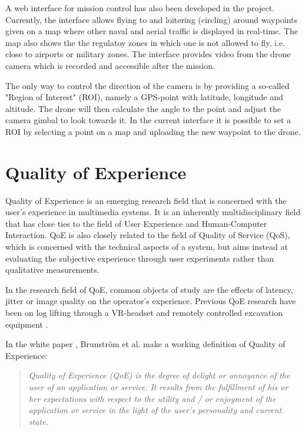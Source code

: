 \documentclass[nofilelist]{cslthse-msc}
\begin{document}
A web interface for mission control has also been developed in the project. Currently, the interface allows flying to and loitering (circling) around waypoints given on a map where other naval and aerial traffic is displayed in real-time. The map also shows the the regulatoy zones in which one is not allowed to fly, i.e. close to airports or military zones. The interface provides video from the drone camera which is recorded and accessible after the mission.

The only way to control the direction of the camera is by providing a so-called "Region of Interest" (ROI), namely a GPS-point with latitude, longitude and altitude. The drone will then calculate the angle to the point and adjust the camera gimbal to look towards it. In the current interface it is possible to set a ROI by selecting a point on a map and uploading the new waypoint to the drone.

\section{Quality of Experience}
Quality of Experience is an emerging research field that is concerned with the user's experience in multimedia systems. It is an inherently multidisciplinary field that has close ties to the field of User Experience and Human-Computer Interaction. QoE is also closely related to the field of Quality of Service (QoS), which is concerned with the technical aspects of a system, but aims instead at evaluating the subjective experience through user experiments rather than qualitative measurements.

In the research field of QoE, common objects of study are the effects of latency, jitter or image quality on the operator's experience. Previous QoE research have been on log lifting through a VR-headset \cite{industry4.0} and remotely controlled excavation equipment \cite{latency-impact}.

In the white paper \cite{qoe-definition}, Brunström et al. make a working definition of Quality of Experience: 

\begin{quote}
   \textit{Quality of Experience (QoE) is the degree of delight or annoyance of the user of an application or service. It results from the fulfillment of his or her expectations with respect to the utility and / or enjoyment of the application or service in the light of the user’s personality and current state.} 
\end{quote}
\end{document}
